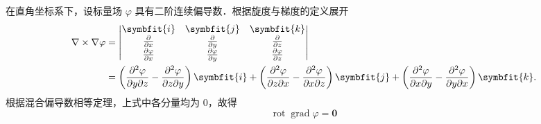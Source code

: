 \begin{myproof}

    在直角坐标系下，设标量场 $\varphi$ 具有二阶连续偏导数．根据旋度与梯度的定义展开
    \begin{equation}\label{eq:rot-grad-proof}
        \begin{aligned}
            \nabla \times \nabla \varphi & = \begin{vmatrix} \symbfit{i} & \symbfit{j} & \symbfit{k} \\ \frac{\partial}{\partial x} & \frac{\partial}{\partial y} & \frac{\partial}{\partial z} \\ \frac{\partial \varphi}{\partial x} & \frac{\partial \varphi}{\partial y} & \frac{\partial \varphi}{\partial z} \end{vmatrix}                                                                                                               \\
                                         & = \left( \frac{\partial^2 \varphi}{\partial y \partial z} - \frac{\partial^2 \varphi}{\partial z \partial y} \right) \symbfit{i} + \left( \frac{\partial^2 \varphi}{\partial z \partial x} - \frac{\partial^2 \varphi}{\partial x \partial z} \right) \symbfit{j} + \left( \frac{\partial^2 \varphi}{\partial x \partial y} - \frac{\partial^2 \varphi}{\partial y \partial x} \right) \symbfit{k}.
        \end{aligned}
    \end{equation}
    根据混合偏导数相等定理，上式中各分量均为 $0$，故得
    \begin{equation}\label{eq:rot-grad-final}
        \boxed{\operatorname{rot} \operatorname{grad} \varphi = \symbf{0}}
    \end{equation}



\end{myproof}
